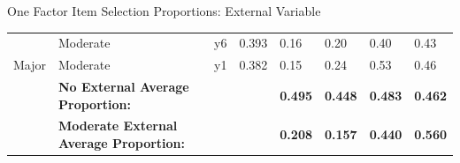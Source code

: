 \documentclass[ignorenonframetext,]{beamer}
\begin{document}
\begin{frame}{One Factor Item Selection Proportions: External Variable}
\begin{table}[H]
{\begin{tabular}{llllllll}
 & Moderate & y6 & 0.393 & 0.16 & 0.20 & 0.40 & 0.43\\

\multirow{-6}{*}{\raggedright\arraybackslash Major} & Moderate & y1 & 0.382 & 0.15 & 0.24 & 0.53 & 0.46\\
\cmidrule{1-8}
\textbf{} & \textbf{No External Average Proportion:} & \textbf{} & \textbf{} & \textbf{0.495} & \textbf{0.448} & \textbf{0.483} & \textbf{0.462}\\
\cmidrule{1-8}
\textbf{} & \textbf{Moderate External Average Proportion:} & \textbf{} & \textbf{} & \textbf{0.208} & \textbf{0.157} & \textbf{0.440} & \textbf{0.560}\\
\bottomrule
\end{tabular}}
\end{table}

\end{frame}
\end{document}
